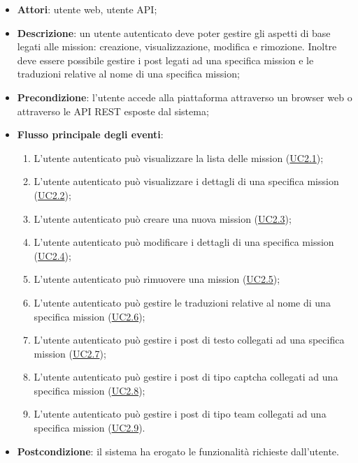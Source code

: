\begin{itemize}
\item \textbf{Attori}: utente web, utente API;
\item \textbf{Descrizione}: un utente autenticato deve poter gestire gli aspetti di base legati alle mission: creazione, visualizzazione, modifica e rimozione.
Inoltre deve essere possibile gestire i post legati ad una specifica mission e le traduzioni relative al nome di una specifica mission; 
      \item \textbf{Precondizione}: l'utente accede alla piattaforma attraverso un browser web o attraverso le API REST esposte dal sistema;

        \item \textbf{Flusso principale degli eventi}:
          \begin{enumerate}
          \item L'utente autenticato può visualizzare la lista delle mission (\hyperlink{UC2.1}{UC2.1});
          \item L'utente autenticato può visualizzare i dettagli di una specifica mission (\hyperlink{UC2.2}{UC2.2});
          \item L'utente autenticato può creare una nuova mission (\hyperlink{UC2.3}{UC2.3});
          \item L'utente autenticato può modificare i dettagli di una specifica mission (\hyperlink{UC2.4}{UC2.4});
          \item L'utente autenticato può rimuovere una mission (\hyperlink{UC2.5}{UC2.5});
          \item L'utente autenticato può gestire le traduzioni relative al nome di una specifica mission (\hyperlink{UC2.6}{UC2.6});
          \item L'utente autenticato può gestire i post di testo collegati ad una specifica mission (\hyperlink{UC2.7}{UC2.7});
          \item L'utente autenticato può gestire i post di tipo captcha collegati ad una specifica mission (\hyperlink{UC2.8}{UC2.8});
          \item L'utente autenticato può gestire i post di tipo team collegati ad una specifica mission (\hyperlink{UC2.9}{UC2.9}).

      \end{enumerate}
    \item \textbf{Postcondizione}: il sistema ha erogato le funzionalità richieste dall'utente.
  \end{itemize}
\hypertarget{UC2.1}{}

